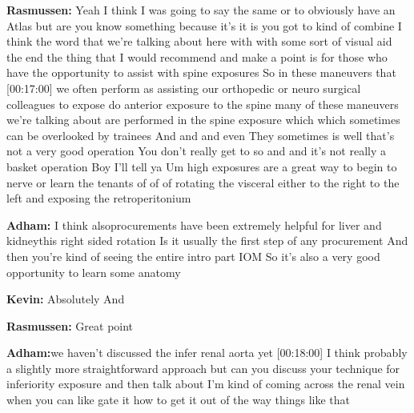 \documentclass[
]{book}
\begin{document}
\textbf{Rasmussen:} Yeah I think I was going to say the same or to obviously
have an Atlas but are you know something because it's it is you got to
kind of combine I think the word that we're talking about here with with
some sort of visual aid the end the thing that I would recommend and
make a point is for those who have the opportunity to assist with spine
exposures So in these maneuvers that {[}00:17:00{]} we often perform as
assisting our orthopedic or neuro surgical colleagues to expose do
anterior exposure to the spine many of these maneuvers we're talking
about are performed in the spine exposure which which sometimes can be
overlooked by trainees And and and even They sometimes is well that's
not a very good operation You don't really get to so and and it's not
really a basket operation Boy I'll tell ya Um high exposures are a great
way to begin to nerve or learn the tenants of of of rotating the
visceral either to the right to the left and exposing the
retroperitonium

\textbf{Adham:} I think alsoprocurements have been extremely helpful for
liver and kidneythis right sided rotation Is it usually the first step
of any procurement And then you're kind of seeing the entire intro part
IOM So it's also a very good opportunity to learn some anatomy

\textbf{Kevin:} Absolutely And

\textbf{Rasmussen:} Great point

\textbf{Adham:}we haven't discussed the infer renal aorta yet {[}00:18:00{]} I
think probably a slightly more straightforward approach but can you
discuss your technique for inferiority exposure and then talk about I'm
kind of coming across the renal vein when you can like gate it how to
get it out of the way things like that
\end{document}

